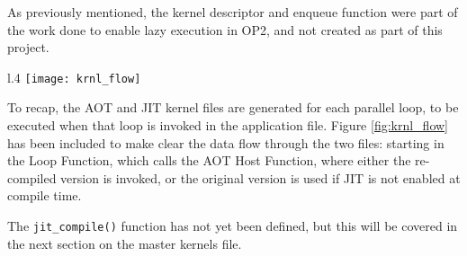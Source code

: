 \noindent As previously mentioned, the kernel descriptor and enqueue function were part of the work done to enable lazy execution in OP2, and not created as part of this project.

\vspace{2em}

\begin{wrapfigure}[13]{l}{.4\textwidth}
  \vspace{-2em}
  \centering
  \texttt{[image: krnl\_flow]}
  \caption{Kernel Flow}
  \label{fig:krnl_flow}
\end{wrapfigure}

\label{impl_summary}

To recap, the AOT and JIT kernel files are generated for each parallel loop, to be executed when that loop is invoked in the application file. Figure \ref{fig:krnl_flow} has been included to make clear the data flow through the two files: starting in the Loop Function, which calls the AOT Host Function, where either the re-compiled version is invoked, or the original version is used if JIT is not enabled at compile time.

The \verb|jit_compile()| function has not yet been defined, but this will be covered in the next section on the master kernels file.
\clearpage
